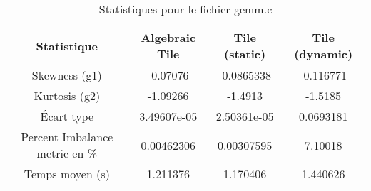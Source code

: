 \documentclass{article}
\begin{document}
\begin{table}[htbp]
  \centering
  \caption{Statistiques pour le fichier gemm.c}
  \begin{tabular}{|c|c|c|c|}
    \hline
    Statistique & Algebraic Tile & Tile (static) & Tile (dynamic) \\ 
    \hline
    Skewness (g1) & -0.07076 & -0.0865338 & -0.116771 \\ 
    Kurtosis (g2) & -1.09266 & -1.4913 & -1.5185 \\ 
    Écart type & 3.49607e-05 & 2.50361e-05 & 0.0693181\\ 
    Percent Imbalance metric en \% & 0.00462306 & 0.00307595 & 7.10018\\ 
    Temps moyen (s) & 1.211376 & 1.170406 & 1.440626 \\ 
    \hline
  \end{tabular}
\end{table}
\newpage
\end{document}
